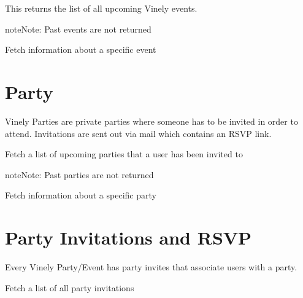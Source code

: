\documentclass[letterpaper,10pt,english]{sphinxmanual}
\begin{document}
This returns the list of all upcoming Vinely events.

\begin{notice}{note}{Note:}
Past events are not returned
\end{notice}

Fetch information about a specific event


\begin{fulllineitems}
\label{parties:get--api-v1-event-_id_-}
\end{fulllineitems}



\section{Party}
\label{parties:party}
Vinely Parties are private parties where someone has to be invited in order to attend.
Invitations are sent out via mail which contains an RSVP link.

Fetch a list of upcoming parties that a user has been invited to


\begin{fulllineitems}
\label{parties:get--api-v1-party-}
\end{fulllineitems}


\begin{notice}{note}{Note:}
Past parties are not returned
\end{notice}

Fetch information about a specific party


\begin{fulllineitems}
\label{parties:get--api-v1-party-_id_-}
\end{fulllineitems}



\section{Party Invitations and RSVP}
\label{parties:party-invitations-and-rsvp}
Every Vinely Party/Event has party invites that associate users with a party.

Fetch a list of all party invitations


\begin{fulllineitems}
\label{parties:get--api-v1-partyinvite-}
\end{fulllineitems}
\end{document}
